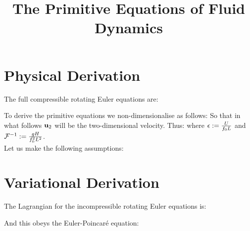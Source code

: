 \documentclass[10pt]{article}
\begin{document}
\title{The Primitive Equations of Fluid Dynamics}
\date{}
\maketitle

\section{Physical Derivation}

The full compressible rotating Euler equations are:

To derive the primitive equations we non-dimensionalise as follows:
So that in what follows $\mathbf{u}_{2}$ will be the two-dimensional velocity. Thus:
where $\epsilon : = \frac{U}{f_{0}L}$ and $\mathcal{F}^{-1}: = \frac{gH}{f_{0}^{2}L^{2}}$.\\
Let us make the following assumptions:
\section{Variational Derivation}

The Lagrangian for the incompressible rotating Euler equations is:

And this obeys the Euler-Poincar\'{e} equation:
\end{document}
